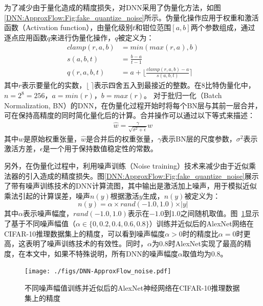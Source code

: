 为了减少由于量化造成的精度损失，对DNN采用了伪量化方法\cite{DNN:fake_quanti}，如图\ref{DNN:ApproxFlow:Fig:fake_quantize_noise}所示。伪量化操作应用于权重和激活函数（Activation function），由量化级别$t$和钳位范围$[a,b]$两个参数组成，通过逐点应用函数$q$来进行伪量化操作，$q$被定义为：
\begin{align}
    clamp(r, a, b) &= min(max(r, a), b) \\
    s(a, b, t)     &= \frac{b - a}{t - 1} \\
    q(r, a, b, t)  &= a + \lfloor \frac{clamp(r, a, b) - a}{s(a, b, t)} \rceil
\label{DNN:ApproxFlow:Eq:fake_quantize}
\end{align}
其中$r$表示要量化的实数，$\lfloor \ \rceil$表示四舍五入到最接近的整数。在8比特伪量化中，$n=2^8=256$，$a=min(r)$，$b=max(r)$。
对于批归一化（Batch Normalization, BN）的DNN，在伪量化过程开始时将每个BN层与其前一层合并，可在保持高精度的同时简化量化后的计算。合并操作可以通过以下等式来描述：
\begin{equation}
    \label{DNN:ApproxFlow:Eq:BN}
    \begin{aligned}
    \hat{w} = \frac{\gamma}{\sqrt{\sigma^2 + \epsilon}} w
    \end{aligned}
\end{equation}
其中$w$是原始权重张量，$\hat{w}$是合并后的权重张量，$\gamma$表示BN层的尺度参数，$\sigma ^2$表示激活方差，$\epsilon$是一个用于保持数值稳定性的常数。

另外，在伪量化\cite{DNN:fake_quanti}过程中，利用噪声训练（Noise training）技术来减少由于近似乘法器的引入造成的精度损失。图\ref{DNN:ApproxFlow:Fig:fake_quantize_noise}展示了带有噪声训练技术的DNN计算流图，其中输出是激活加上噪声，用于模拟近似乘法引起的计算误差，噪声$n(y)$根据激活$y$生成，$n(y)$被定义为：
\begin{equation}
    \label{DNN:ApproxFlow:Eq:noise}
    n(y) = \alpha \times rand(-1.0, 1.0) \times \vert y \vert
\end{equation}
其中$\alpha$表示噪声幅度，$rand(-1.0,1.0)$表示在$-1.0$到$1.0$之间随机取值。图~\ref{DNN:ApproxFlow:Fig:noise}显示了基于不同噪声幅值（$\alpha \in \{0,0.2,0.4,0.6,0.8\}$）训练并近似后的AlexNet网络\cite{DNN:AlexNet}在CIFAR-10\cite{DNN:CIFAR-10}推理数据集上的精度，可以看到噪声幅度$\alpha > 0$时的精度比$\alpha = 0$时更高，这表明了噪声训练技术的有效性。同时，$\alpha$为0.8时AlexNet实现了最高的精度，在本文中，如果不特殊说明，所有DNN的噪声幅度$\alpha$取值均为$0.8$。
\begin{figure}[!ht]
    \centering
    \texttt{[image: ./figs/DNN-ApproxFlow\_noise.pdf]}
    \caption{不同噪声幅值训练并近似后的AlexNet神经网络在CIFAR-10推理数据集上的精度}
    \label{DNN:ApproxFlow:Fig:noise}
\end{figure}


